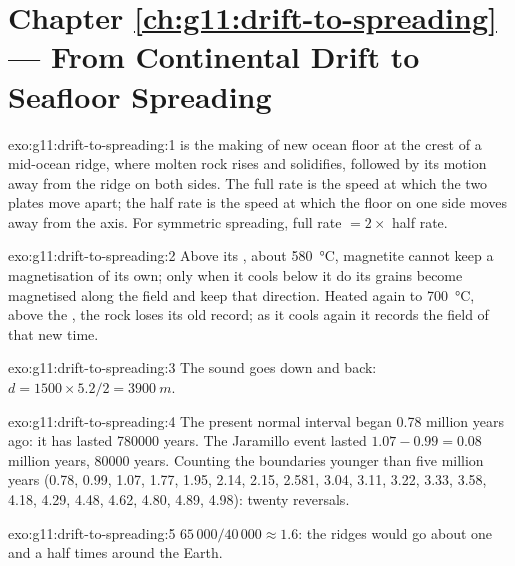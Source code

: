 \section*{Chapter \ref{ch:g11:drift-to-spreading} --- From Continental Drift to Seafloor Spreading}

\begin{solution}{exo:g11:drift-to-spreading:1}
 is the making of new ocean floor at the crest of a
mid-ocean ridge, where molten rock rises and solidifies, followed by its
motion away from the ridge on both sides. The full rate is the speed at which
the two plates move apart; the half rate is the speed at which the floor on
one side moves away from the axis. For symmetric spreading, full rate $= 2
\times$ half rate.
\end{solution}

\begin{solution}{exo:g11:drift-to-spreading:2}
Above its , about \qty{580}{\celsius}, magnetite cannot keep a
magnetisation of its own; only when it cools below it do its grains become
magnetised along the field and keep that direction. Heated again to
\qty{700}{\celsius}, above the , the rock loses its old
record; as it cools again it records the field of that new time.
\end{solution}

\begin{solution}{exo:g11:drift-to-spreading:3}
The sound goes down and back: $d = 1500 \times 5.2/2 = \qty{3900}{m}$.
\end{solution}

\begin{solution}{exo:g11:drift-to-spreading:4}
The present normal interval began \num{0.78} million years ago: it has lasted
\num{780000} years. The Jaramillo event lasted $1.07 - 0.99 = \num{0.08}$
million years, \num{80000} years. Counting the boundaries younger than five
million years (0.78, 0.99, 1.07, 1.77, 1.95, 2.14, 2.15, 2.581, 3.04, 3.11,
3.22, 3.33, 3.58, 4.18, 4.29, 4.48, 4.62, 4.80, 4.89, 4.98): twenty reversals.
\end{solution}

\begin{solution}{exo:g11:drift-to-spreading:5}
$65\,000/40\,000 \approx 1.6$: the ridges would go about one and a half
times around the Earth.
\end{solution}

